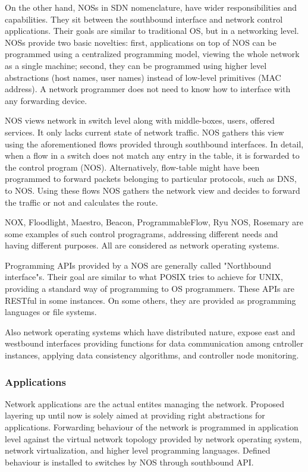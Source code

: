 \documentclass[12pt,journal,compsoc]{IEEEtran}
\begin{document}
On the other hand, NOSs in SDN nomenclature, have wider responsibilities and capabilities.
 They sit between the southbound interface and network control applications.
 Their goals are similar to traditional OS, but in a networking 
level. NOSs provide two basic novelties: first, applications on top of NOS can 
be programmed using a centralized programming model, viewing the whole network as 
a single machine; second, they can be programmed using higher level
abstractions (host names, user names) instead of low-level primitives (MAC address).
 A network programmer does not need to know how to interface with any forwarding 
device.

NOS views network in switch level along with middle-boxes, users, offered services.
 It only lacks current state of network traffic. NOS gathers this view using 
the aforementioned flows provided through southbound interfaces. In detail, when a
 flow in a switch does not match any entry in the table, it is forwarded 
to the control program (NOS). Alternatively, flow-table might have been programmed 
to forward packets belonging to particular protocols, such as DNS, to NOS. Using 
these flows NOS gathers the network view and decides to forward the traffic or not
 and calculates the route.

 NOX, Floodlight, Maestro, Beacon, ProgrammableFlow, Ryu NOS, Rosemary are some 
examples of such control progragrams, addressing different needs and having 
different purposes. All are considered as network operating systems.

Programming APIs provided by a NOS are generally called "Northbound interface"s.
 Their goal are similar to what POSIX tries to achieve for UNIX, providing a 
standard way of programming to OS programmers. These APIs are RESTful in some 
instances. On some others, they are provided as programming languages or file 
systems.

Also network operating systems which have distributed nature, expose east and 
westbound interfaces providing functions for data communication among 
cntroller instances, applying data consistency algorithms, and controller node 
monitoring.

\subsubsection{Applications}
 Network \cite{norman} applications are the actual entites managing the network. Proposed 
layering up until now is solely aimed at providing right abstractions for 
applications. Forwarding behaviour of the network is programmed in application 
level against the virtual network topology provided by network operating system,
 network virtualization, and higher level programming languages. Defined behaviour 
is installed to switches by NOS through southbound API.
\end{document}
